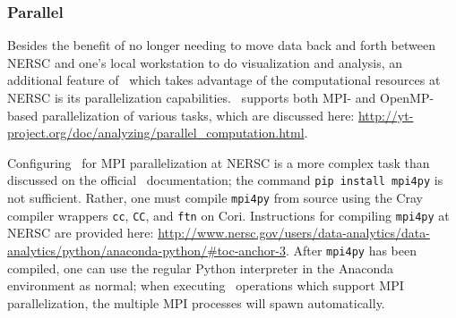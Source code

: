 \subsubsection{Parallel \yt}

Besides the benefit of no longer needing to move data back and forth between
NERSC and one's local workstation to do visualization and analysis, an
additional feature of \yt\ which takes advantage of the computational resources
at NERSC is its parallelization capabilities. \yt\ supports both MPI- and
OpenMP-based parallelization of various tasks, which are discussed here:
\url{http://yt-project.org/doc/analyzing/parallel_computation.html}.

Configuring \yt\ for MPI parallelization at NERSC is a more complex task than
discussed on the official \yt\ documentation; the command \texttt{pip install
mpi4py} is not sufficient. Rather, one must compile \texttt{mpi4py} from source
using the Cray compiler wrappers \texttt{cc}, \texttt{CC}, and \texttt{ftn} on
Cori. Instructions for compiling \texttt{mpi4py} at NERSC are provided here:
\url{http://www.nersc.gov/users/data-analytics/data-analytics/python/anaconda-python/#toc-anchor-3}.
After \texttt{mpi4py} has been compiled, one can use the regular Python
interpreter in the Anaconda environment as normal; when executing \yt\
operations which support MPI parallelization, the multiple MPI processes will
spawn automatically.

